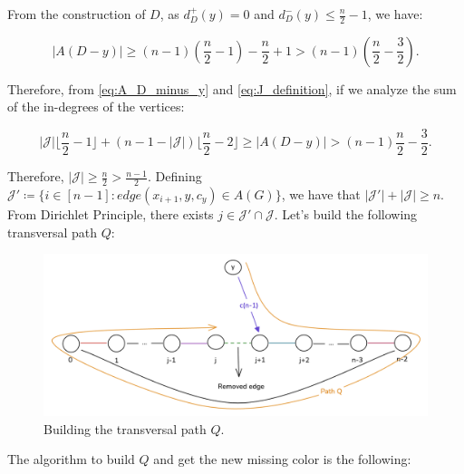 From the construction of $D$, as $d^+_D(y) = 0$ and $d^-_D(y) \leq \frac{n}{2} - 1$, we have:

\begin{equation}
    |A(D - y)| \geq (n - 1) (\frac{n}{2} - 1) - \frac{n}{2} + 1 > (n - 1) (\frac{n}{2} - \frac{3}{2}).
    \label{eq:A_D_minus_y}
\end{equation}

Therefore, from \ref{eq:A_D_minus_y} and \ref{eq:J_definition}, if we analyze
the sum of the in-degrees of the vertices:

\begin{equation}
    |\mathcal{J}| \lfloor \frac{n}{2} - 1 \rfloor + (n - 1 - |\mathcal{J}|) \lfloor \frac{n}{2} - 2 \rfloor \geq |A(D - y)| > (n - 1) \frac{n}{2} - \frac{3}{2}.
\end{equation}

Therefore, $|\mathcal{J}| \geq \frac{n}{2} > \frac{n - 1}{2}$. Defining 
$\mathcal{J}' \coloneqq \{i \in [n - 1]: edge(x_{i+1}, y, c_y) \in A(G)\}$, we have that 
$|\mathcal{J}'| + |\mathcal{J}| \geq n$. From Dirichlet Principle, there exists 
$j \in \mathcal{J}' \cap \mathcal{J}$. Let's build the following transversal path $Q$:

\begin{figure}[H]
    \centering
    \includegraphics[width=1\textwidth]{figuras/cycle_n-1_path_q.png}
    \caption{Building the transversal path $Q$.}
    \label{fig:cycle_n-1_path_q}
\end{figure}

The algorithm to build $Q$ and get the new missing color is the following:

